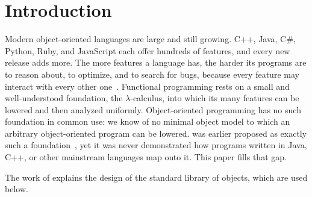 
\section{Introduction}

Modern object-oriented languages are large and still growing.
C++, Java, C\#, Python, Ruby, and JavaScript each offer hundreds of
  features, and every new release adds more.
The more features a language has, the harder its programs are to reason
  about, to optimize, and to search for bugs, because every feature may
  interact with every other one~\citep{dunsmore1978programming,
  mccabe1976complexity, basili1984software, chambers1989customization}.
Functional programming rests on a small and well-understood foundation,
  the \(\lambda\)-calculus, into which its many features can be lowered
  and then analyzed uniformly.
Object-oriented programming has no such foundation in common use: we know
  of no minimal object model to which an arbitrary object-oriented program
  can be lowered.
\eolang{} was earlier proposed as exactly such a
  foundation~\citep{bugayenko2021eolang}, yet it was never demonstrated
  how programs written in Java, C++, or other mainstream languages map
  onto it.
This paper fills that gap.

The work of \citet{bugayenko2022origins} explains the design of the \eolang{}
  standard library of objects, which are used below.
